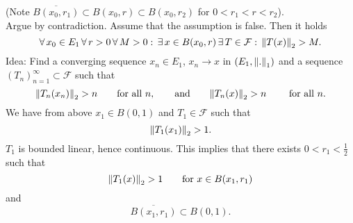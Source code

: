 \begin{beweis}
\begin{enumerate}[Step 1:]
\[			\]
			(Note $\overline{B(x_0,r_1)} \subset B(x_0,r) \subset B(x_0,r_2)$ for $0 < r_1 < r < r_2$). \\
			Argue by contradiction. Assume that the assumption is false. Then it holds
			\[
				\forall\, x_0 \in E_1 \, \forall\, r >0 \,\forall\,  M>0: \,\exists\, x \in B(x_0,r) \,\exists\, T \in \mathcal{F} : \, \norm{T(x)}_2 > M.
			\]
			Idea: Find a converging sequence $x_n \in E_1$, $x_n \to x$ in $(E_1,\norm{.}_1)$ and a sequence $(T_n)_{n=1}^{\infty} \subset \mathcal{F}$ such that
			\[
				\norm{T_n(x_n)}_2 > n \qquad \text{for all }n, \qquad \text{and} \qquad \norm{T_n(x)}_2 > n \qquad \text{ for all }n.
			\]
			We have from above $x_1 \in B(0,1)$ and $T_1 \in  \mathcal{F}$ such that \[
				\norm{T_1(x_1)}_2 > 1.
			\] $T_1$ is bounded linear, hence continuous. This implies that there exists $0<r_1 < \frac{1}{2}$ such that
			\[
				\norm{T_1(x)}_2 >1 \qquad \text{for }x \in B(x_1,r_1)
			\]
			and \[
				\overline{B(x_1,r_1)}\subset B(0,1).
			\]
		\end{enumerate}
	\end{beweis}